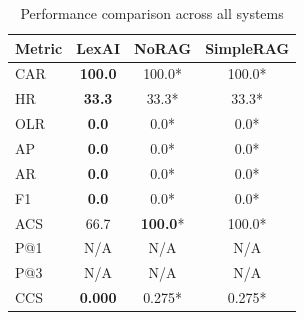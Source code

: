 \begin{table}[ht]
\centering
\caption{Performance comparison across all systems}
\label{tab:main_results}
\begin{tabular}{lccc}
\toprule
\textbf{Metric} & \textbf{LexAI} & \textbf{NoRAG} & \textbf{SimpleRAG} \\
\midrule
CAR & \textbf{100.0} & 100.0* & 100.0* \\
HR & \textbf{33.3} & 33.3* & 33.3* \\
OLR & \textbf{0.0} & 0.0* & 0.0* \\
AP & \textbf{0.0} & 0.0* & 0.0* \\
AR & \textbf{0.0} & 0.0* & 0.0* \\
F1 & \textbf{0.0} & 0.0* & 0.0* \\
ACS & 66.7 & \textbf{100.0}* & 100.0* \\
P@1 & N/A & N/A & N/A \\
P@3 & N/A & N/A & N/A \\
CCS & \textbf{0.000} & 0.275* & 0.275* \\
\bottomrule
\end{tabular}
\end{table}